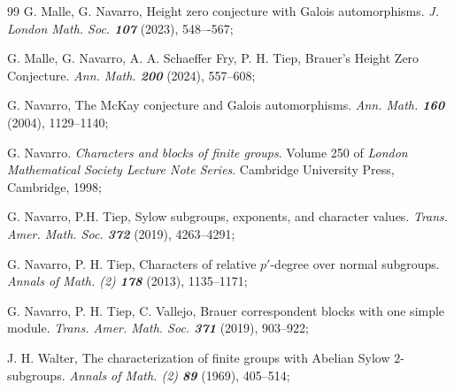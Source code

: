 \begin{thebibliography}{99}
		{\sc G. Malle, G. Navarro}, Height zero conjecture with Galois automorphisms. 
		\emph{J. London Math. Soc. {\bf 107}} (2023), 548{--}-567;
		
		 {\sc G. Malle, G. Navarro, A. A. Schaeffer Fry, P. H. Tiep}, Brauer's Height Zero Conjecture. \emph{Ann. Math. {\bf200}} (2024), 557--608;
		
		 {\sc G. Navarro}, The McKay conjecture and Galois automorphisms. \emph{Ann. Math. {\bf160}} (2004), 1129--1140;
		
		 {\sc G. Navarro}. \emph{Characters and blocks of finite groups}. Volume 250 of \emph{London Mathematical Society Lecture Note Series}. Cambridge University Press, Cambridge, 1998;
		
		{\sc G. Navarro, P.H. Tiep}, Sylow subgroups, exponents, and character values. \emph{Trans. Amer. Math. Soc. {\bf 372}} (2019), 4263--4291;
		
		{\sc G. Navarro, P. H. Tiep}, Characters of relative $p'$-degree over
		normal subgroups. \emph{Annals of Math. (2) \bf 178} (2013), 1135--1171;
		
		{\sc G. Navarro, P. H. Tiep, C. Vallejo}, Brauer correspondent blocks with one simple module. \emph{Trans. Amer. Math. Soc. \bf{371}} (2019), 903--922;
		
		{\sc J. H. Walter}, The characterization of finite groups with Abelian Sylow
		$2$-subgroups. \emph{Annals of Math. (2) \bf89} (1969), 405--514;
		
	\end{thebibliography}
